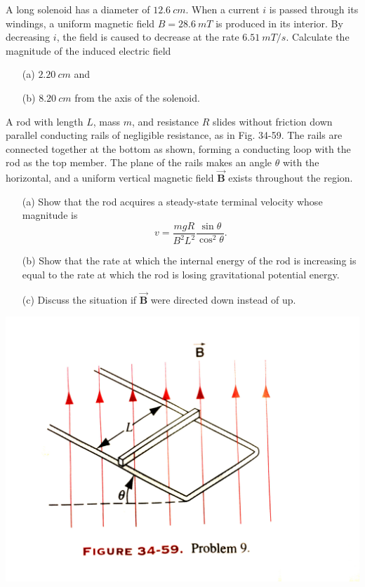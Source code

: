 \documentclass[12pt,letterpaper,boxed,cm]{hmcpset}
\newcommand{\f}[2]{\frac{#1}{#2}}
\begin{document}
\begin{problem}[34-E30]
A long solenoid has a diameter of $\SI{12.6}{cm}$. When a current $i$ is passed through its windings, a uniform magnetic field $B = \SI{28.6}{mT}$ is produced in its interior. By decreasing $i$, the field is caused to decrease at the rate $\SI{6.51}{mT/s}$. Calculate the magnitude of the induced electric field
\begin{enumerate}
	\item[(a)] $\SI{2.20}{cm}$ and
	\item[(b)] $\SI{8.20}{cm}$ from the axis of the solenoid.
\end{enumerate}
\end{problem}
\begin{solution}	
\end{solution}
\newpage

\begin{problem}[34-P9]
	A rod with length $L$, mass $m$, and resistance $R$ slides without friction down parallel conducting rails of negligible resistance, as in Fig. 34-59. The rails are connected together at the bottom as shown, forming a conducting loop with the rod as the top member. The plane of the rails makes an angle $\theta$ with the horizontal, and a uniform vertical magnetic field $\vec{\mathbf{B}}$ exists throughout the region.
	\begin{enumerate}
		\item[(a)] Show that the rod acquires a steady-state terminal velocity whose magnitude is
		\[
			v = \f{mgR}{B^2L^2} \f{\sin\theta}{\cos^2\theta}.
		\] 
		\item[(b)] Show that the rate at which the internal energy of the rod is increasing is equal to the rate at which the rod is losing gravitational potential energy.
		\item[(c)] Discuss the situation if $\vec{\mathbf{B}}$ were directed down instead of up.
	\end{enumerate}
	\begin{center}
		\includegraphics[scale=0.1]{02.jpeg}
	\end{center}
\end{problem}
\begin{solution}
\end{solution}
\end{document}
